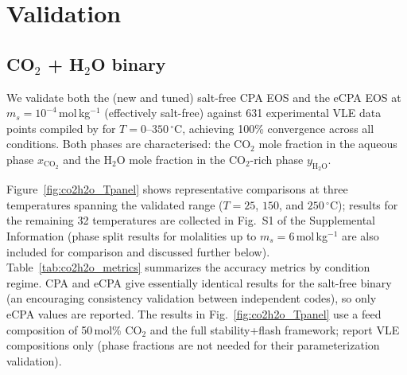 \documentclass[preprint,12pt,number]{elsarticle}
\begin{document}
\section{Validation}
\label{sec:validation}

\subsection{CO$_2$ + H$_2$O binary}
\label{sec:co2h2o}

We validate both the (new and tuned) salt-free CPA EOS and the eCPA EOS at $m_s = 10^{-4}$\,mol\,kg$^{-1}$
(effectively salt-free) against 631 experimental VLE data points compiled by \citet{Coelho2025}
for $T = 0$--$350\,^\circ$C, achieving 100\% convergence across all conditions.
Both phases are characterised: the CO$_2$ mole fraction in the aqueous phase $x_{\text{CO}_2}$ and
the H$_2$O mole fraction in the CO$_2$-rich phase $y_{\text{H}_2\text{O}}$.

Figure~\ref{fig:co2h2o_Tpanel} shows representative comparisons at three temperatures spanning
the validated range ($T = 25$, $150$, and $250\,^\circ$C); results for the remaining 32 temperatures are collected in
Fig.~S1 of the Supplemental Information (phase split results for molalities up to $m_s = 6$\,mol\,kg$^{-1}$ are also included for comparison and discussed further below).
Table~\ref{tab:co2h2o_metrics} summarizes the accuracy metrics by condition regime.
CPA and eCPA give essentially identical results for the salt-free binary (an encouraging
consistency validation between independent codes), so only eCPA values are reported.
The results in Fig.~\ref{fig:co2h2o_Tpanel} use a feed composition of 50\,mol\% CO$_2$
and the full stability+flash framework; \citet{Coelho2025} report VLE compositions only
(phase fractions are not needed for their parameterization validation).
\end{document}
